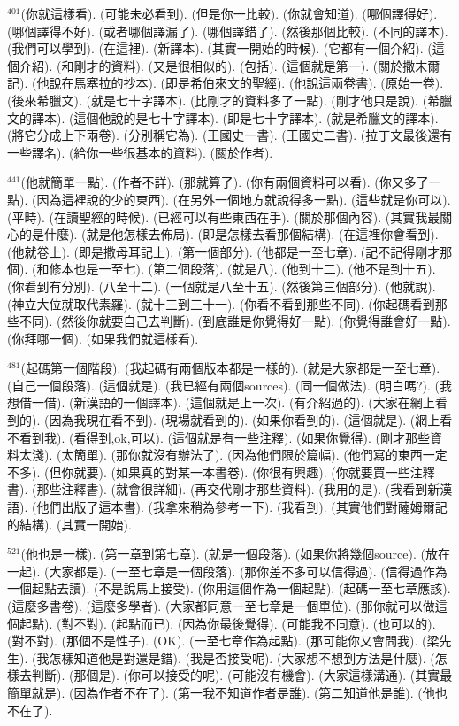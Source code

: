 \documentclass{book}
\begin{document}
$^{401}$(你就這樣看).
(可能未必看到).
(但是你一比較).
(你就會知道).
(哪個譯得好).
(哪個譯得不好).
(或者哪個譯漏了).
(哪個譯錯了).
(然後那個比較).
(不同的譯本).
(我們可以學到).
(在這裡).
(新譯本).
(其實一開始的時候).
(它都有一個介紹).
(這個介紹).
(和剛才的資料).
(又是很相似的).
(包括).
(這個就是第一).
(關於撒末爾記).
(他說在馬塞拉的抄本).
(即是希伯來文的聖經).
(他說這兩卷書).
(原始一卷).
(後來希臘文).
(就是七十字譯本).
(比剛才的資料多了一點).
(剛才他只是說).
(希臘文的譯本).
(這個他說的是七十字譯本).
(即是七十字譯本).
(就是希臘文的譯本).
(將它分成上下兩卷).
(分別稱它為).
(王國史一書).
(王國史二書).
(拉丁文最後還有一些譯名).
(給你一些很基本的資料).
(關於作者).

$^{441}$(他就簡單一點).
(作者不詳).
(那就算了).
(你有兩個資料可以看).
(你又多了一點).
(因為這裡說的少的東西).
(在另外一個地方就說得多一點).
(這些就是你可以).
(平時).
(在讀聖經的時候).
(已經可以有些東西在手).
(關於那個內容).
(其實我最關心的是什麼).
(就是他怎樣去佈局).
(即是怎樣去看那個結構).
(在這裡你會看到).
(他就卷上).
(即是撒母耳記上).
(第一個部分).
(他都是一至七章).
(記不記得剛才那個).
(和修本也是一至七).
(第二個段落).
(就是八).
(他到十二).
(他不是到十五).
(你看到有分別).
(八至十二).
(一個就是八至十五).
(然後第三個部分).
(他就說).
(神立大位就取代素羅).
(就十三到三十一).
(你看不看到那些不同).
(你起碼看到那些不同).
(然後你就要自己去判斷).
(到底誰是你覺得好一點).
(你覺得誰會好一點).
(你拜哪一個).
(如果我們就這樣看).

$^{481}$(起碼第一個階段).
(我起碼有兩個版本都是一樣的).
(就是大家都是一至七章).
(自己一個段落).
(這個就是).
(我已經有兩個sources).
(同一個做法).
(明白嗎?).
(我想借一借).
(新漢語的一個譯本).
(這個就是上一次).
(有介紹過的).
(大家在網上看到的).
(因為我現在看不到).
(現場就看到的).
(如果你看到的).
(這個就是).
(網上看不看到我).
(看得到,ok,可以).
(這個就是有一些注釋).
(如果你覺得).
(剛才那些資料太淺).
(太簡單).
(那你就沒有辦法了).
(因為他們限於篇幅).
(他們寫的東西一定不多).
(但你就要).
(如果真的對某一本書卷).
(你很有興趣).
(你就要買一些注釋書).
(那些注釋書).
(就會很詳細).
(再交代剛才那些資料).
(我用的是).
(我看到新漢語).
(他們出版了這本書).
(我拿來稍為參考一下).
(我看到).
(其實他們對薩姆爾記的結構).
(其實一開始).

$^{521}$(他也是一樣).
(第一章到第七章).
(就是一個段落).
(如果你將幾個source).
(放在一起).
(大家都是).
(一至七章是一個段落).
(那你差不多可以信得過).
(信得過作為一個起點去讀).
(不是說馬上接受).
(你用這個作為一個起點).
(起碼一至七章應該).
(這麼多書卷).
(這麼多學者).
(大家都同意一至七章是一個單位).
(那你就可以做這個起點).
(對不對).
(起點而已).
(因為你最後覺得).
(可能我不同意).
(也可以的).
(對不對).
(那個不是性子).
(OK).
(一至七章作為起點).
(那可能你又會問我).
(梁先生).
(我怎樣知道他是對還是錯).
(我是否接受呢).
(大家想不想到方法是什麼).
(怎樣去判斷).
(那個是).
(你可以接受的呢).
(可能沒有機會).
(大家這樣溝通).
(其實最簡單就是).
(因為作者不在了).
(第一我不知道作者是誰).
(第二知道他是誰).
(他也不在了).
\end{document}
